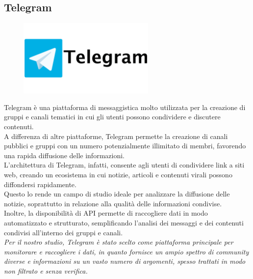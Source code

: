 \documentclass[12pt]{article}
\begin{document}
	\subsection{Telegram}
	\begin{figure}[H]
		\centering
		\includegraphics[width=0.6\textwidth]{immagini/telegram}
	\end{figure}
	Telegram è una piattaforma di messaggistica molto utilizzata per la creazione di gruppi e canali tematici in cui gli utenti possono condividere e discutere contenuti.\\
	A differenza di altre piattaforme, Telegram permette la creazione di canali pubblici e gruppi con un numero potenzialmente illimitato di membri, favorendo una rapida diffusione delle informazioni. \\L'architettura di Telegram, infatti, consente agli utenti di condividere link a siti web, creando un ecosistema in cui notizie, articoli e contenuti virali possono diffondersi rapidamente. \\Questo lo rende un campo di studio ideale per analizzare la diffusione delle notizie, soprattutto in relazione alla qualità delle informazioni condivise. \\Inoltre, la disponibilità di API permette di raccogliere dati in modo automatizzato e strutturato, semplificando l'analisi dei messaggi e dei contenuti condivisi all'interno dei gruppi e canali. \\\textit{Per il nostro studio, Telegram è stato scelto come piattaforma principale per monitorare e raccogliere i dati, in quanto fornisce un ampio spettro di community diverse e informazioni su un vasto numero di argomenti, spesso trattati in modo non filtrato e senza verifica.}
\end{document}
